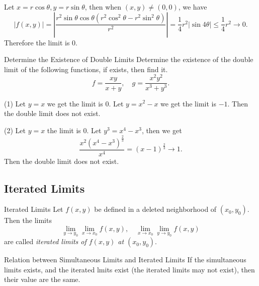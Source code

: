 \begin{solution}
  Let $x = r \cos \theta, y = r \sin \theta$,
  then when $(x, y) \neq (0, 0)$, we have
  \begin{equation}
    |f(x,y)|=\left|\frac{r^2\sin\theta\cos\theta(r^2\cos^2\theta-r^2\sin^2\theta)}{r^2}\right|=\frac{1}{4}r^2|\sin4\theta|\leq\frac{1}{4}r^2\to 0.
  \end{equation}
  Therefore the limit is $0$.
\end{solution}

\begin{example}{Determine the Existence of Double Limits}{}
  Determine the existence of the double limit of the following functions,
  if exists, then find it.
  \begin{equation}
    f = \frac{xy}{x+y}, \quad
    g = \frac{x^2y^2}{x^3 + y^3}.
  \end{equation}
\end{example}

\begin{solution}
  (1) Let $y = x$ we get the limit is $0$.
  Let $y = x^2 - x$ we get the limit is $-1$.
  Then the double limit does not exist.

  (2) Let $y = x$ the limit is $0$.
  Let $y^3 = x^4 - x^3$, then we get 
  \begin{equation}
    \frac{x^2 (x^4 - x^3)^{\frac{2}{3}}}{x^4} = (x - 1)^{\frac{2}{3}} \rightarrow 1.
  \end{equation}
  Then the double limit does not exist.
\end{solution}

\subsection{Iterated Limits}

\begin{definition}{Iterated Limits}{}
  Let $f(x, y)$ be defined in a deleted neighborhood of $(x_0, y_0)$.
  Then the limits
  \begin{equation}
    \lim \limits _{y \rightarrow y_0} \lim \limits _{x \rightarrow x_0} f(x,y), \quad
    \lim \limits _{x \rightarrow x_0} \lim \limits _{y\rightarrow y_0} f(x,y)
  \end{equation}
  are called \emph{iterated limits of $f(x,y)$ at $(x_0, y_0)$}.
\end{definition}

\begin{proposition}{Relation between Simultaneous Limits and Iterated Limits}{}
  If the simultaneous limits exists,
  and the iterated lmits exist (the iterated limits may not exist),
  then their value are the same.
\end{proposition}

